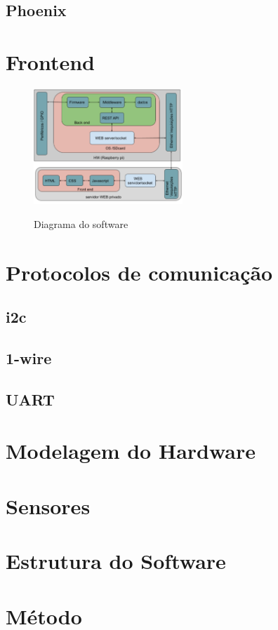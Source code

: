 \documentclass[../../layout.tex]{subfiles}
\begin{document}
\subsection{Phoenix}
\hspace*{3em}\blindtext[1]


\section{Frontend}
\hspace*{3em}\blindtext[1]

\begin{figure}[H]
\centering
\caption{Diagrama do software}
\includegraphics[width=0.5\textwidth]{assets/static/img/diagrama_tcc.PNG}
\label{fig:diagrama_sw}
\end{figure}

\section{Protocolos de comunicação} 
\hspace*{3em}\blindtext[1]
\subsection{i2c}
\hspace*{3em}\blindtext[1]
\subsection{1-wire}
\hspace*{3em}\blindtext[1]
\subsection{UART}
\hspace*{3em}\blindtext[1]

\section{Modelagem do Hardware}
\hspace*{3em}\blindtext[1]

\section{Sensores}
\hspace*{3em}\blindtext[1]

\section{Estrutura do Software}
\hspace*{3em}\blindtext[1]

\section{Método}
\hspace*{3em}\blindtext[1]
\end{document}
